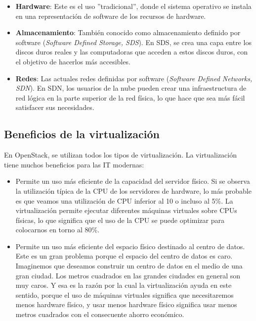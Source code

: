 
\begin{itemize}
\item 
\textbf{Hardware}: Este es el uso ''tradicional'', donde el sistema operativo se instala en una representación de software de los recursos de hardware.
\item 
\textbf{Almacenamiento}: También conocido como almacenamiento definido por software (\textit{Software Defined Storage, SDS}). En SDS, se crea una capa entre los discos duros reales y las computadoras que acceden a estos discos duros, con el 	objetivo de hacerlos más accesibles.
\item 
\textbf{Redes}:	Las actuales redes definidas por software (\textit{Software Defined Networks, SDN}). En SDN, los usuarios de la nube pueden crear una infraestructura de red lógica en la parte superior de la red física, lo que hace que sea más fácil satisfacer sus necesidades.
\end{itemize}


\subsection{Beneficios de la virtualización}
En OpenStack, se utilizan todos los tipos de virtualización. La virtualización tiene muchos beneficios para las IT modernas:

\begin{itemize}
\item 
Permite un uso más eficiente de la capacidad del servidor físico. Si se observa la utilización típica de la CPU de los servidores de hardware, lo más probable es que veamos una utilización de CPU inferior al 10 o incluso al 5\%. La virtualización permite ejecutar diferentes máquinas virtuales sobre CPUs físicas, lo que significa que el uso de la CPU se puede optimizar para colocarnos en torno al 80\%.
\end{itemize}

\begin{itemize}
\item 
Permite un uso más eficiente del espacio físico destinado al centro de datos. Este es un gran problema porque el espacio del centro de datos es caro. Imaginemos que deseamos construir un centro de datos en el medio de una gran ciudad. Los metros cuadrados en las grandes ciudades en general son muy caros. Y esa es la razón por la cual la virtualización ayuda en este sentido, porque el uso de máquinas virtuales significa que necesitaremos menos hardware físico, y usar menos hardware físico significa usar menos metros cuadrados con el consecuente ahorro económico. 
\end{itemize}

